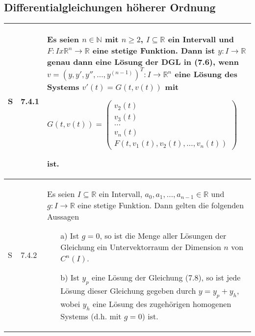 \subsection{Differentialgleichungen höherer Ordnung}

    \begin{longtable}{p{0.75cm} p{1cm} p{16cm}}
        \toprule
        S   & 7.4.1 &   Es seien $n \in \mathbb{N}$ mit $n \geq 2$, $I \subseteq \mathbb{R}$ ein Intervall und $F: Ix \mathbb{R}^n \rightarrow \mathbb{R}$
                        eine stetige Funktion. Dann ist $y: I \rightarrow \mathbb{R}$ genau dann eine Lösung der DGL in (7.6), wenn $v = (y,y',y''
                        ,\dots, y^{(n-1)})^T:I \rightarrow \mathbb{R}^n$ eine Lösung des Systems $v'(t) = G(t,v(t))$ mit \hfill \break
                        \centerline{$ G(t,v(t)) =   \begin{pmatrix}
                                                    v_2(t) \\
                                                    v_3(t) \\
                                                    \dots \\
                                                    v_n(t) \\
                                                    F(t,v_1(t),v_2(t),\dots,v_n(t)) 
                                                    \end{pmatrix}  $} 
                        ist. \\
        \midrule
        S   & 7.4.2 &   Es seien $I \subseteq \mathbb{R}$ ein Intervall, $a_0,a_1, \dots, a_{n-1} \in \mathbb{R}$ und $g: I \rightarrow \mathbb{R}$ eine
                        stetige Funktion. Dann gelten die folgenden Aussagen
                        \begin{itemize}[topsep=-0.5cm]
                            \item[a)] Ist $g=0$, so ist die Menge aller Lösungen der Gleichung ein Untervektorraum der Dimension $n$ von $C^n(I)$.
                            \item[b)] Ist $y_p$ eine Lösung der Gleichung (7.8), so ist jede Lösung dieser Gleichung gegeben durch $y = y_p + y_h$, wobei
                                        $y_h$ eine Lösung des zugehörigen homogenen Systems (d.h. mit $g=0$) ist.   
                        \end{itemize} \vspace{-0cm} \\
        \midrule

\end{longtable}
